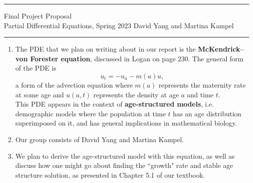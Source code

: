 \documentclass[11pt]{article}
\begin{document}
	\hrule
	\begin{center}
		{\Large Final Project Proposal} \\ %
		\vspace{0.2cm}
		Partial Differential Equations, Spring 2023 \hfill David Yang and Martina Kampel%
	\end{center}

\hrule

\vspace{1em}

\begin{enumerate}
    \item The PDE that we plan on writing about in our report is the \textbf{McKendrick–von Forester equation}, discussed in Logan on page 230. The general form of the PDE is 
    \[ u_t = -u_a - m(a)u, \] a form of the advection equation where $m(a)$ represents the maternity rate at some age and $u(a, t)$ represents the density at age $a$ and time $t$. \\
    
    This PDE appears in the context of \textbf{age-structured models}, i.e. demographic models where the population at time $t$ has an age distribution superimposed on it, and has general implications in mathematical biology.
    \item Our group consists of David Yang and Martina Kampel.
    \item We plan to derive the age-structured model with this equation, as well as discuss how one might go about finding the ``growth" rate and stable age structure solution, as presented in Chapter 5.1 of our textbook. \\


\end{enumerate}
\end{document}
